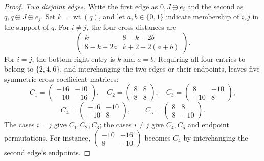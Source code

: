 \documentclass[11pt,a4paper]{article}
\theoremstyle{definition}
\theoremstyle{remark}
\begin{document}
\begin{proof}
\smallskip\noindent\emph{Two disjoint edges.}
Write the first edge as $0,J\oplus e_i$ and the second as
$q,q\oplus J\oplus e_j$. Set $k=\operatorname{wt}(q)$, and let
$a,b\in\{0,1\}$ indicate membership of $i,j$ in the support of $q$.
For $i\ne j$, the four cross distances are
\[
\begin{pmatrix}k&8-k+2b\\8-k+2a&k+2-2(a+b)\end{pmatrix}.
\]
For $i=j$, the bottom-right entry is $k$ and $a=b$. Requiring all four
entries to belong to $\{2,4,6\}$, and interchanging the two edges or
their endpoints, leaves five symmetric cross-coefficient matrices:
\[
C_1=\begin{pmatrix}-16&-10\\-10&-16\end{pmatrix},\quad
C_2=\begin{pmatrix}8&8\\8&8\end{pmatrix},\quad
C_3=\begin{pmatrix}8&-10\\-10&8\end{pmatrix},
\]
\[
C_4=\begin{pmatrix}-16&-10\\-10&8\end{pmatrix},\qquad
C_5=\begin{pmatrix}8&8\\8&-10\end{pmatrix}.
\]
The cases $i=j$ give $C_1,C_2,C_3$; the cases $i\ne j$ give $C_4,C_5$
and endpoint permutations. For instance,
$\left(\begin{smallmatrix}-10&-16\\8&-10\end{smallmatrix}\right)$
becomes $C_4$ by interchanging the second edge's endpoints.


\end{proof}
\end{document}
